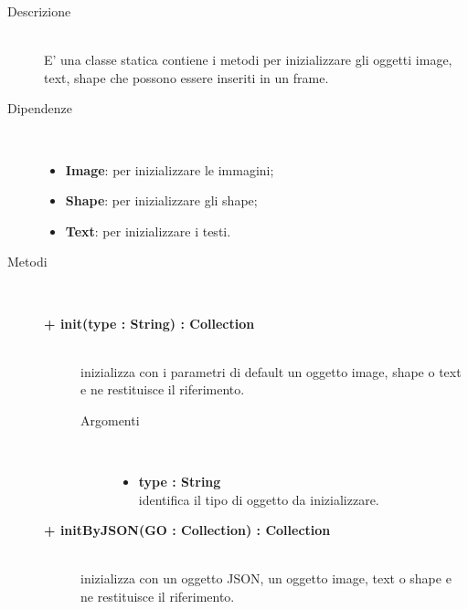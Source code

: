 \begin{description}
\item[Descrizione] \hfill \\
	E' una classe statica contiene i metodi per inizializzare gli oggetti image, text, shape che possono essere inseriti in un frame.
	
	\item[Dipendenze] \hfill \\
	\begin{itemize}
		\item \textbf{Image}: per inizializzare le immagini;
		\item \textbf{Shape}: per inizializzare gli shape;
		\item \textbf{Text}: per inizializzare i testi.
	\end{itemize}
	
\item[Metodi] \hfill \\

	\begin{description}
		\item[\textbf{\color{blue}+ init(type : String) : Collection			}] \hfill \\
			inizializza con i parametri di default un oggetto image, shape o text e ne restituisce il riferimento.
			
		\begin{description}
			\item[Argomenti] \hfill \\
				\begin{itemize}
				
					\item \textbf{type : String			} \hfill \\
					identifica il tipo di oggetto da inizializzare.
				\end{itemize}
		\end{description}

\end{description}

	\begin{description}
		\item[\textbf{\color{blue}+ initByJSON(GO : Collection) : Collection			}] \hfill \\
			inizializza con un oggetto JSON, un oggetto image, text o shape e ne restituisce il riferimento.
			

\end{description}
\end{description}
